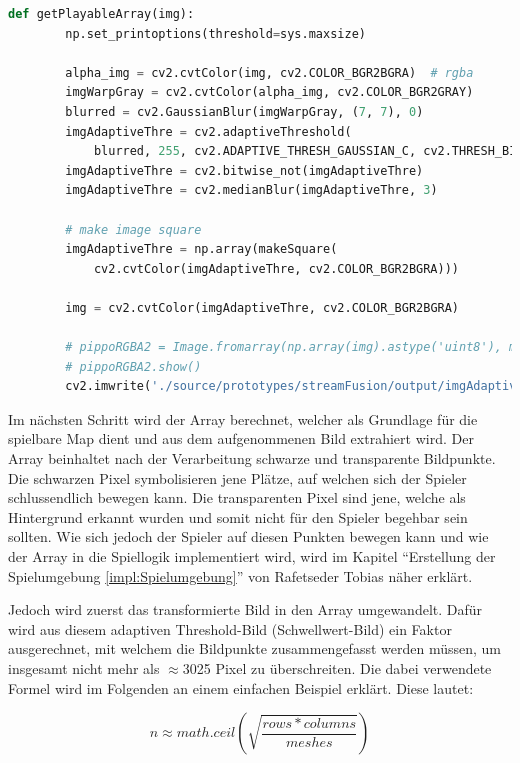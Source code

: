 \begin{lstlisting}[language=Python,caption=Bild in Spielbare Map umwandeln,label=lst:umsetzung:getplayablearray]
    def getPlayableArray(img):
        np.set_printoptions(threshold=sys.maxsize)

        alpha_img = cv2.cvtColor(img, cv2.COLOR_BGR2BGRA)  # rgba
        imgWarpGray = cv2.cvtColor(alpha_img, cv2.COLOR_BGR2GRAY)
        blurred = cv2.GaussianBlur(imgWarpGray, (7, 7), 0)
        imgAdaptiveThre = cv2.adaptiveThreshold(
            blurred, 255, cv2.ADAPTIVE_THRESH_GAUSSIAN_C, cv2.THRESH_BINARY_INV, 7, 2)
        imgAdaptiveThre = cv2.bitwise_not(imgAdaptiveThre)
        imgAdaptiveThre = cv2.medianBlur(imgAdaptiveThre, 3)

        # make image square
        imgAdaptiveThre = np.array(makeSquare(
            cv2.cvtColor(imgAdaptiveThre, cv2.COLOR_BGR2BGRA)))

        img = cv2.cvtColor(imgAdaptiveThre, cv2.COLOR_BGR2BGRA)

        # pippoRGBA2 = Image.fromarray(np.array(img).astype('uint8'), mode='RGBA')
        # pippoRGBA2.show()
        cv2.imwrite('./source/prototypes/streamFusion/output/imgAdaptiveThre.png', imgAdaptiveThre)
\end{lstlisting}

Im nächsten Schritt wird der Array berechnet, welcher als Grundlage für die spielbare Map dient und aus dem aufgenommenen Bild extrahiert wird. Der Array beinhaltet nach der Verarbeitung schwarze und transparente Bildpunkte. Die schwarzen Pixel symbolisieren jene Plätze, auf welchen sich der Spieler schlussendlich bewegen kann. Die transparenten Pixel sind jene, welche als Hintergrund erkannt wurden und somit nicht für den Spieler begehbar sein sollten. Wie sich jedoch der Spieler auf diesen Punkten bewegen kann und wie der Array in die Spiellogik implementiert wird, wird im Kapitel ``Erstellung der Spielumgebung \ref{impl:Spielumgebung}'' von Rafetseder Tobias näher erklärt.

Jedoch wird zuerst das transformierte Bild in den Array umgewandelt. Dafür wird aus diesem adaptiven Threshold-Bild (Schwellwert-Bild) ein Faktor ausgerechnet, mit welchem die Bildpunkte zusammengefasst werden müssen, um insgesamt nicht mehr als \(\approx\)3025 Pixel zu überschreiten. Die dabei verwendete Formel wird im Folgenden an einem einfachen Beispiel erklärt. Diese lautet:

\[
  n \approx math.ceil(\sqrt{ \frac{ rows * columns }{ meshes } })
\]

